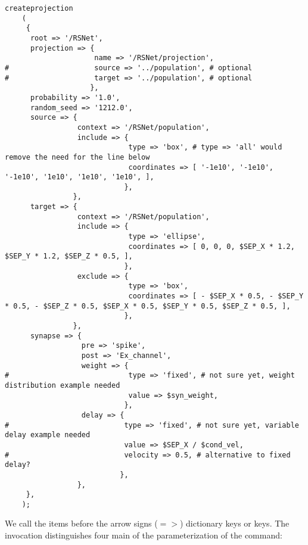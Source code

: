 \documentclass[12pt]{article}
\begin{document}
\begin{verbatim}
createprojection
    (
     {
      root => '/RSNet',
      projection => {
                     name => '/RSNet/projection',
#                    source => '../population', # optional
#                    target => '../population', # optional
                    },
      probability => '1.0',
      random_seed => '1212.0',
      source => {
                 context => '/RSNet/population',
                 include => {
                             type => 'box', # type => 'all' would remove the need for the line below
                             coordinates => [ '-1e10', '-1e10', '-1e10', '1e10', '1e10', '1e10', ],
                            },
                },
      target => {
                 context => '/RSNet/population',
                 include => {
                             type => 'ellipse',
                             coordinates => [ 0, 0, 0, $SEP_X * 1.2, $SEP_Y * 1.2, $SEP_Z * 0.5, ],
                            },
                 exclude => {
                             type => 'box',
                             coordinates => [ - $SEP_X * 0.5, - $SEP_Y * 0.5, - $SEP_Z * 0.5, $SEP_X * 0.5, $SEP_Y * 0.5, $SEP_Z * 0.5, ],
                            },
                },
      synapse => {
                  pre => 'spike',
                  post => 'Ex_channel',
                  weight => {
#                            type => 'fixed', # not sure yet, weight distribution example needed
                             value => $syn_weight,
                            },
                  delay => {
#                           type => 'fixed', # not sure yet, variable delay example needed
                            value => $SEP_X / $cond_vel,
#                           velocity => 0.5, # alternative to fixed delay?
                           },
                 },
     },
    );
\end{verbatim}

We call the items before the arrow signs ($=>$) dictionary keys or
keys.  The invocation distinguishes four main of the parameterization
of the command:
\end{document}
